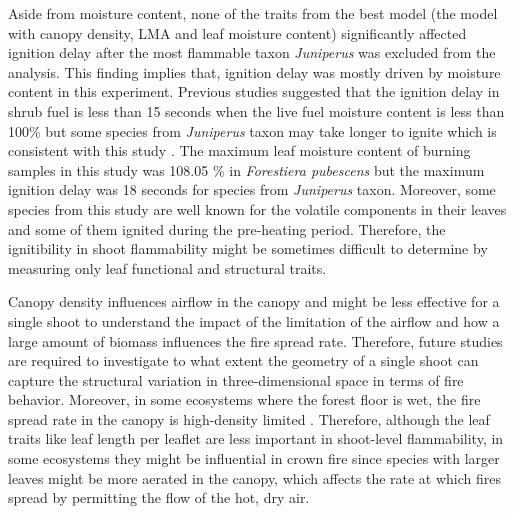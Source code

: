 \documentclass{ttuthes2007}
\begin{document}
\noindent Aside from moisture content, %
none of the traits from the best model (the model with canopy density, LMA and leaf moisture content) significantly affected ignition delay after the most flammable taxon \emph{Juniperus} was excluded from the analysis. %
This finding implies that, ignition delay was mostly driven by moisture content in this experiment. Previous studies suggested that the ignition delay in shrub fuel is less than 15 seconds when the live fuel moisture content %
is less than 100\% but some species from \emph{Juniperus} taxon may take longer to ignite which is consistent with this study \citep{dimitrakopoulos2001flammability,pellizzaro2007seasonal}. The maximum leaf moisture content of burning samples
in this study was 108.05 \% in \emph{Forestiera pubescens} but the maximum ignition delay was 18 seconds for species from \emph{Juniperus} taxon.
Moreover, some species from this study are well known for the volatile components in their leaves and some of them  ignited during the pre-heating period. Therefore, the ignitibility in shoot flammability might be sometimes difficult to determine by measuring only leaf functional and structural traits.

\noindent Canopy density influences airflow in the canopy \citep{cionco1978analysis} and might be less effective for a single shoot to understand the impact of the limitation of the airflow and how a large amount of biomass influences the fire spread rate. %
Therefore, future studies are required to investigate to what extent the geometry of a single shoot can capture the structural variation in three-dimensional space in terms of fire behavior. Moreover, in some ecosystems where the forest floor is wet, the fire spread rate in the canopy is high-density limited  \citep{ray2005micrometeorological}. Therefore, although the leaf traits like leaf length per leaflet are less important in shoot-level flammability, in some ecosystems they might be influential in crown fire since species with larger leaves might be more aerated in the canopy, which affects the rate at which fires spread by permitting the flow of the hot, dry air. 
\end{document}
